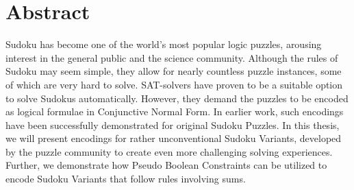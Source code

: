 \chapter{Abstract}
Sudoku has become one of the world's most popular logic puzzles, arousing interest in the general public and the science community. Although the rules of Sudoku may seem simple, they allow for nearly countless puzzle instances, some of which are very hard to solve. SAT-solvers have proven to be a suitable option to solve Sudokus automatically. However, they demand the puzzles to be encoded as logical formulae in Conjunctive Normal Form. In earlier work, such encodings have been successfully demonstrated for original Sudoku Puzzles. In this thesis, we will present encodings for rather unconventional Sudoku Variants, developed by the puzzle community to create even more challenging solving experiences. Further, we demonstrate how Pseudo Boolean Constraints can be utilized to encode Sudoku Variants that follow rules involving sums.
